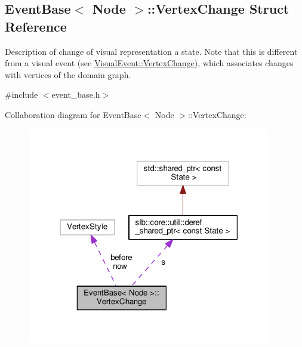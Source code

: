 \hypertarget{structEventBase_1_1VertexChange}{}\subsection{Event\+Base$<$ Node $>$\+:\+:Vertex\+Change Struct Reference}
\label{structEventBase_1_1VertexChange}


Description of change of visual representation a state. Note that this is different from a visual event (see \hyperlink{structVisualEvent_1_1VertexChange}{Visual\+Event\+::\+Vertex\+Change}), which associates changes with vertices of the domain graph.  




{\ttfamily \#include $<$event\+\_\+base.\+h$>$}



Collaboration diagram for Event\+Base$<$ Node $>$\+:\+:Vertex\+Change\+:\nopagebreak
\begin{figure}[H]
\begin{center}
\leavevmode
\includegraphics[width=302pt]{structEventBase_1_1VertexChange__coll__graph}
\end{center}
\end{figure}
